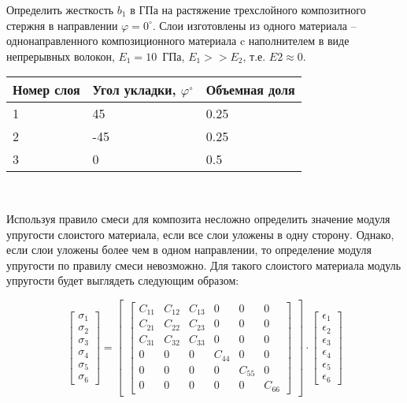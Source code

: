 

Определить жесткость $b_1$ в ГПа на растяжение трехслойного композитного стержня в направлении $\varphi = 0^{\circ}$.
Слои изготовлены из одного материала – однонаправленного композиционного материала c наполнителем в 
виде непрерывных волокон, $E_1=10$~ГПа, $E_1>>E_2$, т.е. $E2 \approx 0$.

\begin{tabular}{|l| l |l|}
    \hline 
     Номер слоя & Угол укладки, $\varphi^{\circ}$ & Объемная доля \\
    \hline 
    1 & 45 & 0.25 \\
    \hline 
    2 & -45 & 0.25 \\
    \hline 
    3 &  0  & 0.5   \\
    \hline
\end{tabular}\\

\explanationSection

Используя правило смеси для композита несложно определить 
значение модуля упругости слоистого материала, если все слои 
уложены в одну сторону. Однако, если слои уложены более чем в 
одном направлении, то определение модуля упругости по правилу 
смеси невозможно. Для такого слоистого материала модуль 
упругости будет выглядеть следующим образом:

$$\begin{bmatrix}
    \sigma_1\\
    \sigma_2\\
    \sigma_3\\
    \sigma_4\\
    \sigma_5\\
    \sigma_6
\end{bmatrix}
=
\begin{bmatrix}
    \begin{bmatrix}
        C_{11} & C_{12} & C_{13} & 0 & 0 & 0 \\
        C_{21} & C_{22} & C_{23} & 0 & 0 & 0 \\
        C_{31} & C_{32} & C_{33} & 0 & 0 & 0 \\
        0 & 0 & 0 & C_{44} & 0 & 0\\
        0 & 0 & 0 & 0 & C_{55} & 0\\
        0 & 0 & 0 & 0 & 0 & C_{66}
    \end{bmatrix}
\end{bmatrix}
\cdot
\begin{bmatrix}
    \epsilon_1\\
    \epsilon_2\\
    \epsilon_3\\
    \epsilon_4\\
    \epsilon_5\\
    \epsilon_6
\end{bmatrix}
$$

